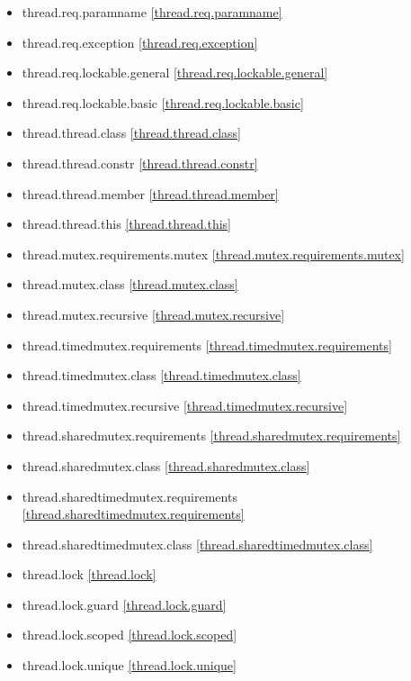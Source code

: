 \begin{multicols}{2}
\begin{itemize}
\item{thread.req.paramname                  \ref{thread.req.paramname}}
\item{thread.req.exception                  \ref{thread.req.exception}}
\item{thread.req.lockable.general           \ref{thread.req.lockable.general}}
\item{thread.req.lockable.basic             \ref{thread.req.lockable.basic}}
\item{thread.thread.class                   \ref{thread.thread.class}}
\item{thread.thread.constr                  \ref{thread.thread.constr}}
\item{thread.thread.member                  \ref{thread.thread.member}}
\item{thread.thread.this                    \ref{thread.thread.this}}
\item{thread.mutex.requirements.mutex       \ref{thread.mutex.requirements.mutex}}
\item{thread.mutex.class                    \ref{thread.mutex.class}}
\item{thread.mutex.recursive                \ref{thread.mutex.recursive}}
\item{thread.timedmutex.requirements        \ref{thread.timedmutex.requirements}}
\item{thread.timedmutex.class               \ref{thread.timedmutex.class}}
\item{thread.timedmutex.recursive           \ref{thread.timedmutex.recursive}}
\item{thread.sharedmutex.requirements       \ref{thread.sharedmutex.requirements}}
\item{thread.sharedmutex.class              \ref{thread.sharedmutex.class}}
\item{thread.sharedtimedmutex.requirements  \ref{thread.sharedtimedmutex.requirements}}
\item{thread.sharedtimedmutex.class         \ref{thread.sharedtimedmutex.class}}
\item{thread.lock                           \ref{thread.lock}}
\item{thread.lock.guard                     \ref{thread.lock.guard}}
\item{thread.lock.scoped                    \ref{thread.lock.scoped}}
\item{thread.lock.unique                    \ref{thread.lock.unique}}

\end{itemize}
\end{multicols}

